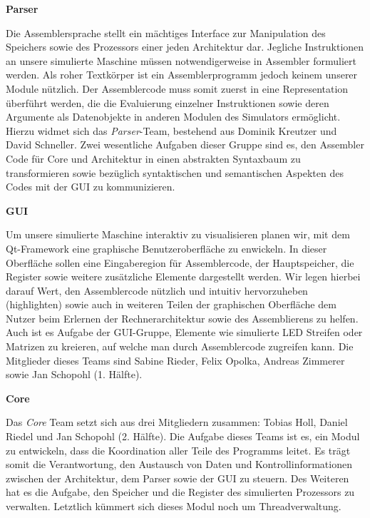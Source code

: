 \textbf{Parser}

Die Assemblersprache stellt ein mächtiges Interface zur Manipulation des
Speichers sowie des Prozessors einer jeden Architektur dar. Jegliche
Instruktionen an unsere simulierte Maschine müssen notwendigerweise in Assembler
formuliert werden. Als roher Textkörper ist ein Assemblerprogramm jedoch keinem
unserer Module nützlich. Der Assemblercode muss somit zuerst in eine
Representation überführt werden, die die Evaluierung einzelner Instruktionen
sowie deren Argumente als Datenobjekte in anderen Modulen des Simulators
ermöglicht. Hierzu widmet sich das \emph{Parser}-Team, bestehend aus Dominik
Kreutzer und David Schneller. Zwei wesentliche Aufgaben dieser Gruppe sind es,
den Assembler Code für Core und Architektur in einen abstrakten Syntaxbaum zu
transformieren sowie bezüglich syntaktischen und semantischen Aspekten des Codes
mit der GUI zu kommunizieren.

\textbf{GUI}

Um unsere simulierte Maschine interaktiv zu visualisieren planen wir, mit dem
Qt-Framework eine graphische Benutzeroberfläche zu enwickeln. In dieser
Oberfläche sollen eine Eingaberegion für Assemblercode, der Hauptspeicher, die
Register sowie weitere zusätzliche Elemente dargestellt werden. Wir legen
hierbei darauf Wert, den Assemblercode nützlich und intuitiv hervorzuheben
(highlighten) sowie auch in weiteren Teilen der graphischen Oberfläche dem
Nutzer beim Erlernen der Rechnerarchitektur sowie des Assemblierens zu
helfen. Auch ist es Aufgabe der GUI-Gruppe, Elemente wie simulierte LED Streifen
oder Matrizen zu kreieren, auf welche man durch Assemblercode zugreifen
kann. Die Mitglieder dieses Teams sind Sabine Rieder, Felix Opolka, Andreas
Zimmerer sowie Jan Schopohl (1. Hälfte).

\textbf{Core}

Das \emph{Core} Team setzt sich aus drei Mitgliedern zusammen: Tobias Holl,
Daniel Riedel und Jan Schopohl (2. Hälfte). Die Aufgabe dieses Teams ist es, ein
Modul zu entwickeln, dass die Koordination aller Teile des Programms leitet. Es
trägt somit die Verantwortung, den Austausch von Daten und Kontrollinformationen
zwischen der Architektur, dem Parser sowie der GUI zu steuern. Des Weiteren hat
es die Aufgabe, den Speicher und die Register des simulierten Prozessors zu
verwalten. Letztlich kümmert sich dieses Modul noch um Threadverwaltung.
